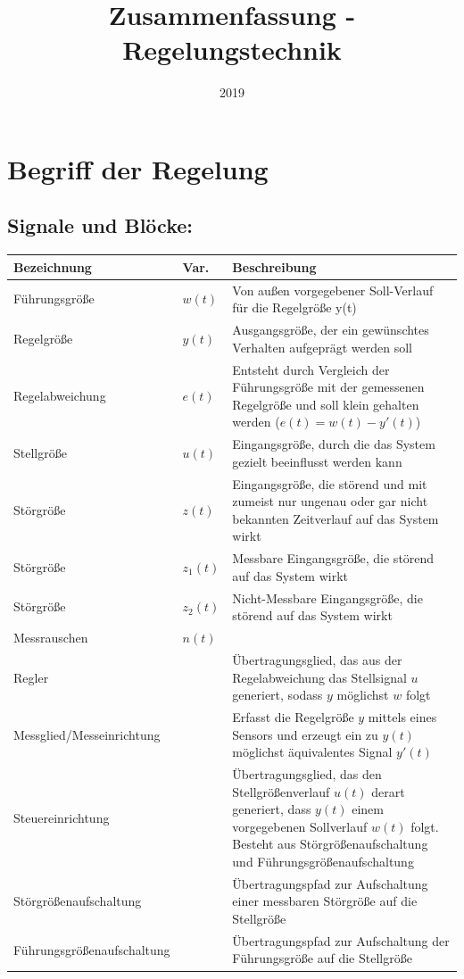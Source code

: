 \documentclass[10pt,a4paper]{article}
\title{Zusammenfassung - Regelungstechnik}
\author{}
\date{2019}
\begin{document}
	\tableofcontents
	\pagebreak
	
\section{Begriff der Regelung}
\subsection{Signale und Blöcke:}
\begin{tabularx}{\columnwidth}{llX}
	Bezeichnung & Var. & Beschreibung \\
	\hline
	Führungsgröße & $w(t)$ & Von außen vorgegebener Soll-Verlauf für die Regelgröße y(t) \\
	Regelgröße & $y(t)$ & Ausgangsgröße, der ein gewünschtes Verhalten aufgeprägt werden soll \\
	Regelabweichung & $e(t)$ & Entsteht durch Vergleich der Führungsgröße mit der gemessenen Regelgröße und soll klein gehalten werden ($e(t) = w(t) - y'(t)$) \\
	Stellgröße & $u(t)$ & Eingangsgröße, durch die das System gezielt beeinflusst werden kann \\
	Störgröße & $z(t)$ & Eingangsgröße, die störend und mit zumeist nur ungenau oder gar nicht bekannten Zeitverlauf auf das System wirkt \\
	Störgröße & $z_1(t)$ & Messbare Eingangsgröße, die störend auf das System wirkt \\
	Störgröße & $z_2(t)$ & Nicht-Messbare Eingangsgröße, die störend auf das System wirkt \\
	Messrauschen & $n(t)$ & \\
	Regler && Übertragungsglied, das aus der Regelabweichung das Stellsignal $u$ generiert, sodass $y$ möglichst $w$ folgt \\
	Messglied/Messeinrichtung && Erfasst die Regelgröße $y$ mittels eines Sensors und erzeugt ein zu $y(t)$ möglichst äquivalentes Signal $y'(t)$	\\
	Steuereinrichtung && Übertragungsglied, das den Stellgrößenverlauf $u(t)$ derart generiert, dass $y(t)$ einem vorgegebenen Sollverlauf $w(t)$ folgt. Besteht aus Störgrößenaufschaltung und Führungsgrößenaufschaltung \\
	Störgrößenaufschaltung && Übertragungspfad zur Aufschaltung einer messbaren Störgröße auf die Stellgröße \\
	Führungsgrößenaufschaltung && Übertragungspfad zur Aufschaltung der Führungsgröße auf die Stellgröße
\end{tabularx}
\end{document}

